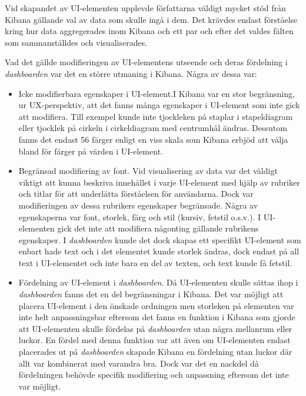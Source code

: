 \documentclass[12pt]{kththesis}
\begin{document}
Vid skapandet av UI-elementen upplevde författarna väldigt mycket stöd från Kibana gällande val av data som skulle ingå i dem. Det krävdes endast förståelse kring hur data aggregerades inom Kibana och ett par och efter det valdes fälten som sammanställdes och visualiserades. 

Vad det gällde modifieringen av UI-elementens utseende och deras fördelning i \textit{dashboarden} var det en större utmaning i Kibana. Några av dessa var:

\begin{itemize}
\item Icke modifierbara egenskaper i UI-element.I Kibana var en stor begränsning, ur UX-perspektiv, att det fanns många egenskaper i UI-element som inte gick att modifiera. Till exempel kunde inte tjockleken på staplar i stapeldiagram eller tjocklek på cirkeln i cirkeldiagram med centrumhål ändras. Dessutom fanns det endast 56 färger enligt en viss skala som Kibana erbjöd att välja bland för färger på värden i UI-element.

\item Begränsad modifiering av font. Vid visualisering av data var det väldigt viktigt att kunna beskriva innehållet i varje UI-element med hjälp av rubriker och titlar för att underlätta förståelsen för användarna. Dock var modifieringen av dessa rubrikers egenskaper begränsade. Några av egenskaperna var font, storlek, färg och stil (kursiv, fetstil o.s.v.). I UI-elementen gick det inte att modifiera någonting gällande rubrikens egenskaper. I \textit{dashboarden} kunde det dock skapas ett specifikt UI-element som enbart hade text och i det elementet kunde storlek ändras, dock endast på all text i UI-elementet och inte bara en del av texten, och text kunde få fetstil.

\item Fördelning av UI-element i \textit{dashboarden}. Då UI-elementen skulle sättas ihop i \textit{dashboarden} fanns det en del begränsningar i Kibana. Det var möjligt att placera UI-element i den önskade ordningen men storleken på elementen var inte helt anpassningsbar eftersom det fanns en funktion i Kibana som gjorde att UI-elementen skulle fördelas på \textit{dashboarden} utan några mellanrum eller luckor. En fördel med denna funktion var att även om UI-elementen endast placerades ut på \textit{dashboarden} skapade Kibana en fördelning utan luckor där allt var kombinerat med varandra bra. Dock var det en nackdel då fördelningen behövde specifik modifiering och anpassning eftersom det inte var möjligt. 
\end{itemize}
\end{document}
